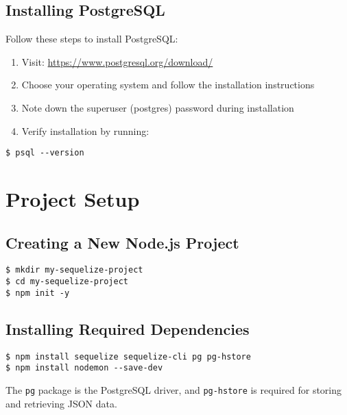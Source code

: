 \documentclass[12pt,a4paper]{book}
\begin{document}
	\subsection{Installing PostgreSQL}
	Follow these steps to install PostgreSQL:
	\begin{enumerate}
		\item Visit: \url{https://www.postgresql.org/download/}
		\item Choose your operating system and follow the installation instructions
		\item Note down the superuser (postgres) password during installation
		\item Verify installation by running:
	\end{enumerate}
	
	\begin{verbatim}
$ psql --version
	\end{verbatim}
	
	\section{Project Setup}
	
	\subsection{Creating a New Node.js Project}

		\begin{verbatim}
$ mkdir my-sequelize-project
$ cd my-sequelize-project
$ npm init -y
		\end{verbatim}

	
	\subsection{Installing Required Dependencies}
	\begin{tcolorbox}[title=Installing Packages]
		\begin{verbatim}
$ npm install sequelize sequelize-cli pg pg-hstore
$ npm install nodemon --save-dev
		\end{verbatim}
	\end{tcolorbox}
	
	\begin{tcolorbox}[title=Note]
		The \texttt{pg} package is the PostgreSQL driver, and \texttt{pg-hstore} is required for storing and retrieving JSON data.
	\end{tcolorbox}
	
\end{document}
